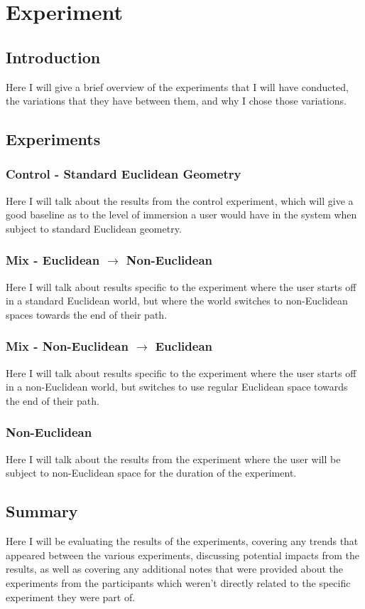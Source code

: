 \chapter{Experiment}
\label{exp}

\section{Introduction}
Here I will give a brief overview of the experiments that I will have conducted, the variations that they have between them, and why I chose those variations.

\section{Experiments}
	\subsection{Control - Standard Euclidean Geometry}
	Here I will talk about the results from the control experiment, which will give a good baseline as to the level of immersion a user would have in the system when subject to standard Euclidean geometry.
	
	\subsection{Mix - Euclidean $\rightarrow$ Non-Euclidean}
	Here I will talk about results specific to the experiment where the user starts off in a standard Euclidean world, but where the world switches to non-Euclidean spaces towards the end of their path.
	
	\subsection{Mix - Non-Euclidean $\rightarrow$ Euclidean}
	Here I will talk about results specific to the experiment where the user starts off in a non-Euclidean world, but switches to use regular Euclidean space towards the end of their path.
	
	\subsection{Non-Euclidean}
	Here I will talk about the results from the experiment where the user will be subject to non-Euclidean space for the duration of the experiment.

\section{Summary}
Here I will be evaluating the results of the experiments, covering any trends that appeared between the various experiments, discussing potential impacts from the results, as well as covering any additional notes that were provided about the experiments from the participants which weren't directly related to the specific experiment they were part of.
